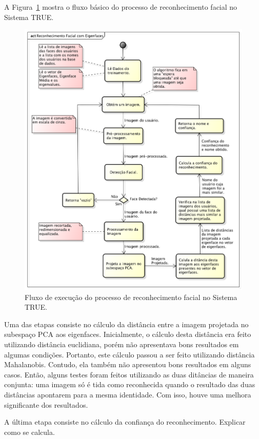 		A Figura~\ref{fig:diagrama-reconhecimento} mostra o fluxo básico do processo de reconhecimento facial no Sistema TRUE.

			\begin{figure}[H]
			\begin{center}
				\includegraphics[scale=0.5]{figuras/4.ProblemaEProposta/diagrama-reconhecimento.png}
			\end{center}
			\caption{Fluxo de execução do processo de reconhecimento facial no Sistema TRUE.}
			\label{fig:diagrama-reconhecimento}
		\end{figure}

		Uma das etapas consiste no cálculo da distância entre a imagem projetada no subespaço PCA aos eigenfaces. Inicialmente, o cálculo desta distância era feito utilizando distância euclidiana, porém não apresentava bons resultados em algumas condições. Portanto, este cálculo passou a ser feito utilizando distância Mahalanobis. Contudo, ela também não apresentou bons resultados em alguns casos. Então, alguns testes foram feitos utilizando as duas ditâncias de maneira conjunta: uma imagem só é tida como reconhecida quando o resultado das duas distâncias apontarem para a mesma identidade. Com isso, houve uma melhora significante dos resultados.

		A última etapa consiste no cálculo da confiança do reconhecimento. Explicar como se calcula.

